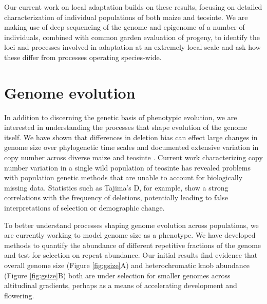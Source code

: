 \documentclass[11pt,letterpaper]{article}
\begin{document}
Our current work on local adaptation builds on these results, focusing on detailed characterization of individual populations of both maize and teosinte. 
We are making use of deep sequencing of the genome and epigenome of a number of individuals, combined  with common garden evaluation of progeny, to identify the loci and processes involved in adaptation at an extremely local scale and ask how these differ from processes operating species-wide. 


\section*{Genome evolution} %

In addition to discerning the genetic basis of phenotypic evolution, we are interested in  understanding the processes that shape evolution of the genome itself.
We have shown that differences in deletion bias can effect large changes in genome size over phylogenetic time scales \citep{tenaillon2011genome} and documented extensive variation in copy number across diverse maize and teosinte \citep{gore2009first, chia2012maize}.
Current work characterizing copy number variation in a single wild population of teosinte has revealed problems with population genetic methods that are unable to account for biologically missing data.
Statistics such as Tajima's D, for example, show a strong correlations with the frequency of deletions,  potentially leading to false interpretations of selection or demographic change. %


To better understand processes shaping genome evolution across populations, we are currently working to model genome size as a phenotype. 
We have developed methods to quantify the abundance of different repetitive fractions of the genome and test for selection on repeat abundance. 
Our initial results find evidence that overall genome size (Figure \ref{fig:gsize}A) and heterochromatic knob abundance (Figure \ref{fig:gsize}B) both are under selection for smaller genomes across altitudinal gradients, perhaps as a means of accelerating development and flowering.
\end{document}
